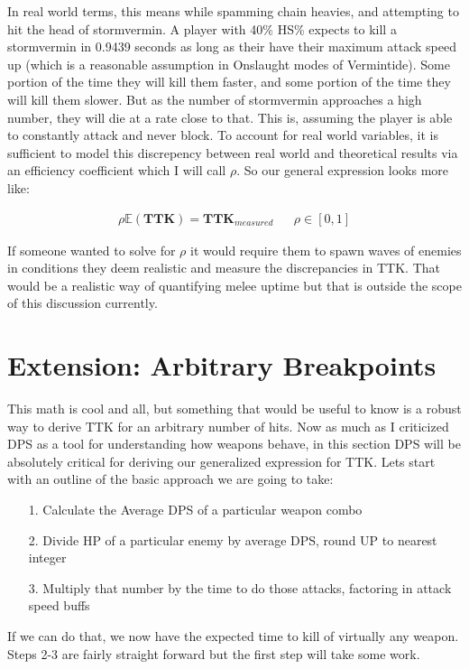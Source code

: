 \documentclass{article}
\begin{document}
In real world terms, this means while spamming chain heavies, and attempting to hit the head of stormvermin. A player with 40\% HS\% expects to kill a stormvermin in 0.9439 seconds as long as their have their maximum attack speed up (which is a reasonable assumption in Onslaught modes of Vermintide). Some portion of the time they will kill them faster, and some portion of the time they will kill them slower. But as the number of stormvermin approaches a high number, they will die at a rate close to that. This is, assuming the player is able to constantly attack and never block. To account for real world variables, it is sufficient to model this discrepency between real world and theoretical results via an efficiency coefficient which I will call $\rho$. So our general expression looks more like:

\begin{align*}
\rho \mathbb{E}(\mathbf{TTK}) = \mathbf{TTK}_{measured} && \rho \in [0,1]
\end{align*}

If someone wanted to solve for $\rho$ it would require them to spawn waves of enemies in conditions they deem realistic and measure the discrepancies in TTK. That would be a realistic way of quantifying melee uptime but that is outside the scope of this discussion currently.

\section*{Extension: Arbitrary Breakpoints}

This math is cool and all, but something that would be useful to know is a robust way to derive TTK for an arbitrary number of hits. Now as much as I criticized DPS as a tool for understanding how weapons behave, in this section DPS will be absolutely critical for deriving our generalized expression for TTK. Lets start with an outline of the basic approach we are going to take:

\begin{enumerate}
\item[1.] Calculate the Average DPS of a particular weapon combo
\item[2.] Divide HP of a particular enemy by average DPS, round UP to nearest integer
\item[3.] Multiply that number by the time to do those attacks, factoring in attack speed buffs
\end{enumerate}

If we can do that, we now have the expected time to kill of virtually any weapon. Steps 2-3 are fairly straight forward but the first step will take some work.
\end{document}
